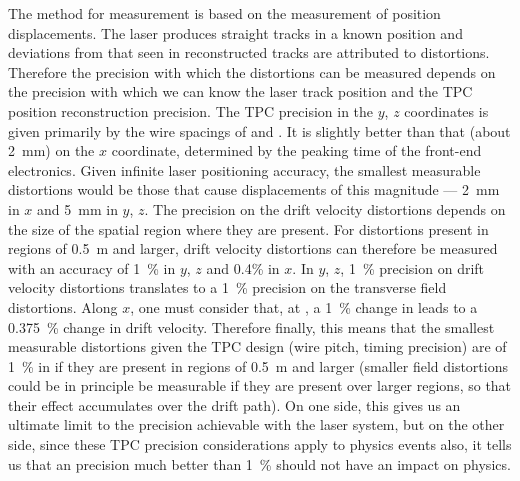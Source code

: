 The method for \efield measurement is based on the measurement of position displacements. The laser produces straight tracks in a known position and deviations from that seen in reconstructed tracks are attributed to \efield distortions. Therefore the precision with which the \efield distortions can be measured depends on the precision with which we can know the laser track position and the TPC position reconstruction precision.
The TPC precision in the $y$, $z$ coordinates is given primarily by the wire spacings of \uvpitch and \xgpitch. It is slightly better than that (about \SI{2}{\milli\m}) on the $x$ coordinate, determined by the \fepeaktime peaking time of the front-end electronics.
Given infinite laser positioning accuracy, the smallest measurable \efield distortions would be those that cause displacements of this magnitude --- \SI{2}{\milli\m} in $x$ and \SI{5}{\milli\m} in $y$, $z$. The precision on the drift velocity distortions depends on the size of the spatial region where they are present. For distortions present in regions of \SI{0.5}{\m} and larger, drift velocity distortions can therefore be measured with an accuracy of \SI{1}{\%} in $y$, $z$ and \num{0.4}\% in $x$. In $y$, $z$, \SI{1}{\%} precision on drift velocity distortions translates to a \SI{1}{\%} precision on the transverse field distortions. Along $x$, one must consider that, at \spmaxfield, a \SI{1}{\%} change in \efield leads to a \SI{0.375}{\%} change in drift velocity. Therefore finally, this means that the smallest measurable distortions given the TPC design (wire pitch, timing precision) are of \SI{1}{\%} in \efield if they are present in regions of \SI{0.5}{\m} and larger (smaller field distortions could be in principle be measurable if they are present over larger regions, so that their effect accumulates over the drift path).
On one side, this gives us an ultimate limit to the \efield precision achievable with the laser system, but on the other side, since these TPC precision considerations apply to physics events also, it tells us that an \efield precision much better than \SI{1}{\%} should not have an impact on physics.

